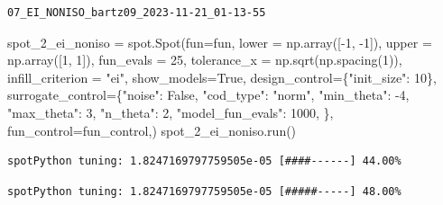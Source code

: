 \documentclass[
  letterpaper,
  DIV=11,
  numbers=noendperiod]{scrreprt}
\newenvironment{Shaded}{\begin{snugshade}}{\end{snugshade}}
\newcommand{\DecValTok}[1]{\textcolor[rgb]{0.68,0.00,0.00}{#1}}
\newcommand{\NormalTok}[1]{\textcolor[rgb]{0.00,0.23,0.31}{#1}}
\newcommand{\OperatorTok}[1]{\textcolor[rgb]{0.37,0.37,0.37}{#1}}
\newcommand{\StringTok}[1]{\textcolor[rgb]{0.13,0.47,0.30}{#1}}
\newcommand{\VariableTok}[1]{\textcolor[rgb]{0.07,0.07,0.07}{#1}}
\begin{document}
\begin{verbatim}
07_EI_NONISO_bartz09_2023-11-21_01-13-55
\end{verbatim}

\begin{Shaded}
\begin{Highlighting}[]
\NormalTok{spot\_2\_ei\_noniso }\OperatorTok{=}\NormalTok{ spot.Spot(fun}\OperatorTok{=}\NormalTok{fun,}
\NormalTok{                   lower }\OperatorTok{=}\NormalTok{ np.array([}\OperatorTok{{-}}\DecValTok{1}\NormalTok{, }\OperatorTok{{-}}\DecValTok{1}\NormalTok{]),}
\NormalTok{                   upper }\OperatorTok{=}\NormalTok{ np.array([}\DecValTok{1}\NormalTok{, }\DecValTok{1}\NormalTok{]),}
\NormalTok{                   fun\_evals }\OperatorTok{=} \DecValTok{25}\NormalTok{,}
\NormalTok{                   tolerance\_x }\OperatorTok{=}\NormalTok{ np.sqrt(np.spacing(}\DecValTok{1}\NormalTok{)),}
\NormalTok{                   infill\_criterion }\OperatorTok{=} \StringTok{"ei"}\NormalTok{,}
\NormalTok{                   show\_models}\OperatorTok{=}\VariableTok{True}\NormalTok{,}
\NormalTok{                   design\_control}\OperatorTok{=}\NormalTok{\{}\StringTok{"init\_size"}\NormalTok{: }\DecValTok{10}\NormalTok{\},}
\NormalTok{                   surrogate\_control}\OperatorTok{=}\NormalTok{\{}\StringTok{"noise"}\NormalTok{: }\VariableTok{False}\NormalTok{,}
                                      \StringTok{"cod\_type"}\NormalTok{: }\StringTok{"norm"}\NormalTok{,}
                                      \StringTok{"min\_theta"}\NormalTok{: }\OperatorTok{{-}}\DecValTok{4}\NormalTok{,}
                                      \StringTok{"max\_theta"}\NormalTok{: }\DecValTok{3}\NormalTok{,}
                                      \StringTok{"n\_theta"}\NormalTok{: }\DecValTok{2}\NormalTok{,}
                                      \StringTok{"model\_fun\_evals"}\NormalTok{: }\DecValTok{1000}\NormalTok{,}
\NormalTok{                                      \},}
\NormalTok{                    fun\_control}\OperatorTok{=}\NormalTok{fun\_control,)}
\NormalTok{spot\_2\_ei\_noniso.run()}
\end{Highlighting}
\end{Shaded}

\begin{verbatim}
spotPython tuning: 1.8247169797759505e-05 [####------] 44.00% 
\end{verbatim}

\begin{verbatim}
spotPython tuning: 1.8247169797759505e-05 [#####-----] 48.00% 
\end{verbatim}
\end{document}
